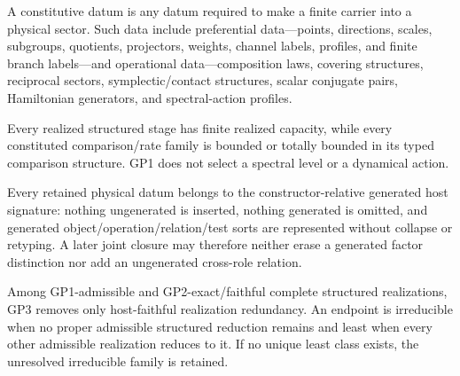 \documentclass[12pt,a4paper]{article}
\begin{document}
\begin{definition}
\label{p3:def:constitutive-datum}
A constitutive datum is any datum required to make a finite carrier into a physical sector.  Such data include preferential data---points, directions, scales, subgroups, quotients, projectors, weights, channel labels, profiles, and finite branch labels---and operational data---composition laws, covering structures, reciprocal sectors, symplectic/contact structures, scalar conjugate pairs, Hamiltonian generators, and spectral-action profiles.
\end{definition}

\begin{principle}
\label{p3:gp1-finiteness}
Every realized structured stage has finite realized capacity, while every
constituted comparison/rate family is bounded or totally bounded in its typed
comparison structure.  GP1 does not select a spectral level or a dynamical
action.
\end{principle}

\begin{principle}
\label{p3:gp2-geometric-primacy}
Every retained physical datum belongs to the constructor-relative generated
host signature: nothing ungenerated is inserted, nothing generated is omitted,
and generated object/operation/relation/test sorts are represented without
collapse or retyping.  A later joint closure may therefore neither erase a
generated factor distinction nor add an ungenerated cross-role relation.
\end{principle}

\begin{principle}
\label{p3:gp3-faithful-closure}
Among GP1-admissible and GP2-exact/faithful complete structured realizations,
GP3 removes only host-faithful realization redundancy.  An endpoint is
irreducible when no proper admissible structured reduction remains and least
when every other admissible realization reduces to it.  If no unique least
class exists, the unresolved irreducible family is retained.
\end{principle}
\end{document}
